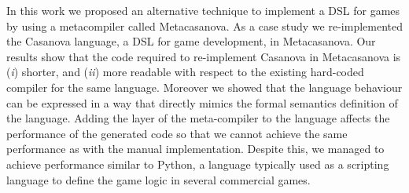 In this work we proposed an alternative technique to implement a DSL for games by using a metacompiler called Metacasanova. As a case study we re-implemented the Casanova language, a DSL for game development, in Metacasanova. Our results show that the code required to re-implement Casanova in Metacasanova is (\textit{i}) shorter, and (\textit{ii}) more readable with respect to the existing hard-coded compiler for the same language. Moreover we showed that the language behaviour can be expressed in a way that directly mimics the formal semantics definition of the language. Adding the layer of the meta-compiler to the language affects the performance of the generated code so that we cannot achieve the same performance as with the manual implementation. Despite this, we managed to achieve performance similar to Python, a language typically used as a scripting language to define the game logic in several commercial games.